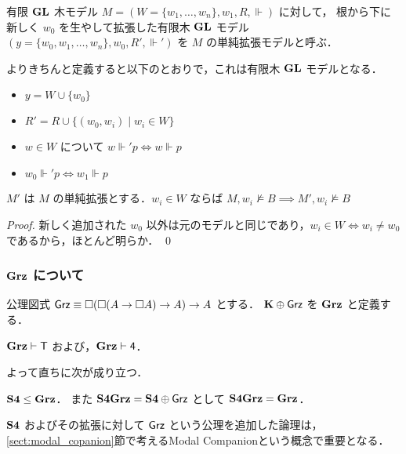 \documentclass{jlreq}
\begin{document}
\begin{definition}
	有限 $\mathbf{GL}$ 木モデル $M = (W = \{w_1,\dots,w_n\}, w_1, R, \Vdash)$ に対して，
	根から下に新しく $w_0$ を生やして拡張した有限木 $\mathbf{GL}$ モデル $(y = \{w_0,w_1,\dots,w_n\}, w_0, R', \Vdash')$ を $M$ の単純拡張モデルと呼ぶ．

	よりきちんと定義すると以下のとおりで，これは有限木 $\mathbf{GL}$ モデルとなる．
	\begin{itemize}
		\item $y = W \cup \{w_0\}$
		\item $R' = R \cup \{(w_0,w_i) \mid w_i \in W\}$
		\item $w \in W$ について $w \Vdash' p \iff w \Vdash p$
		\item $w_0 \Vdash' p \iff w_1 \Vdash p$
	\end{itemize}
\end{definition}

\begin{lemma}\label{lem:simple_extension}
	$M'$ は $M$ の単純拡張とする．$w_i \in W$ ならば $M,w_i \nvDash B \implies M',w_i \nvDash B$
\end{lemma}
\begin{proof}
	新しく追加された $w_0$ 以外は元のモデルと同じであり，$w_i \in W \iff w_i \neq w_0$ であるから，ほとんど明らか．
	\qed
\end{proof}

\subsubsection{$\LogicGrz$ について}

\begin{definition}
	公理図式 $\mathsf{Grz} \equiv \Box(\Box(A \to \Box A) \to A) \to A$ \index{$\AxGrz$} とする．
	$\mathbf{K} \oplus \mathsf{Grz}$ を $\LogicGrz$ と定義する．\index{$\LogicGrz$}
\end{definition}

\begin{lemma}
	$\mathbf{Grz} \vdash \mathsf{T}$ および，$\mathbf{Grz} \vdash \mathsf{4}$．
\end{lemma}

よって直ちに次が成り立つ．

\begin{corollary}\label{cor:S4_weakerThan_Grz}
	$\mathbf{S4} \leq \mathbf{Grz}$．
	また $\mathbf{S4Grz} = \mathbf{S4} \oplus \mathsf{Grz}$ として $\mathbf{S4Grz} = \mathbf{Grz}$．
\end{corollary}

\begin{remark}
	$\mathbf{S4}$ およびその拡張に対して $\AxGrz$ という公理を追加した論理は，
	\ref{sect:modal_copanion}節で考えるModal Companionという概念で重要となる．
\end{remark}
\end{document}
